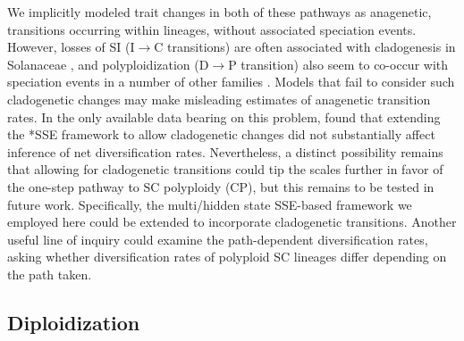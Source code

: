 
We implicitly modeled trait changes in both of these pathways as anagenetic, transitions occurring within lineages, without associated speciation events.
However, losses of SI (I$\rightarrow$C transitions) are often associated with cladogenesis in Solanaceae \citep{goldberg_2012}, and polyploidization (D$\rightarrow$P transition) also seem to co-occur with speciation events in a number of other families \citep{zhan_2016,freyman_2017}.
Models that fail to consider such cladogenetic changes may make misleading estimates of anagenetic transition rates.
In the only available data bearing on this problem, \citet{goldberg_2012} found that extending the *SSE framework to allow cladogenetic changes did not substantially affect inference of net diversification rates.
Nevertheless, a distinct possibility remains that allowing for cladogenetic transitions could tip the scales further in favor of the one-step pathway to SC polyploidy (CP), but this remains to be tested in future work.
Specifically, the multi/hidden state SSE-based framework we employed here could be extended to incorporate cladogenetic transitions.
Another useful line of inquiry could examine the path-dependent diversification rates, asking whether diversification rates of polyploid SC lineages differ depending on the path taken.
 



\subsection*{Diploidization}

